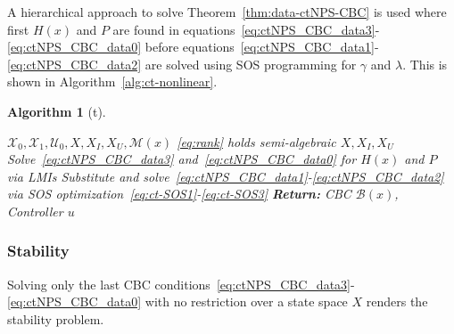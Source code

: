 \documentclass[sigconf]{acmart}
\newtheorem{algorithm}{Algorithm}
\begin{document}


A hierarchical approach to solve Theorem~\ref{thm:data-ctNPS-CBC} is used where first $H(x)$ and $P$ are found in equations~\eqref{eq:ctNPS_CBC_data3}-\eqref{eq:ctNPS_CBC_data0} before equations~\eqref{eq:ctNPS_CBC_data1}-\eqref{eq:ctNPS_CBC_data2} are solved using SOS programming for $\gamma$ and $\lambda$.
This is shown in Algorithm~\ref{alg:ct-nonlinear}.

\begin{algorithm}[t]
\caption{Hierarchy for ct-NPS CBCs}\label{alg:ct-nonlinear}
\begin{algorithmic}[1]
\Require $\mathcal{X}_0,\mathcal{X}_1,\mathcal{U}_0,X,X_I,X_U, \mathcal{M}(x)$
\Ensure \eqref{eq:rank} holds
\Ensure semi-algebraic $X,X_I,X_U$
\State Solve~\eqref{eq:ctNPS_CBC_data3} and~\eqref{eq:ctNPS_CBC_data0} for $H(x)$ and $P$ via LMIs
\State Substitute and solve~\eqref{eq:ctNPS_CBC_data1}-\eqref{eq:ctNPS_CBC_data2} via SOS optimization~\eqref{eq:ct-SOS1}-\eqref{eq:ct-SOS3}
\noindent\Statex\textbf{Return:} CBC $\mathcal{B}(x)$, Controller $u$
\end{algorithmic}
\end{algorithm}

\subsubsection{Stability}

Solving only the last CBC conditions~\eqref{eq:ctNPS_CBC_data3}-\eqref{eq:ctNPS_CBC_data0} with no restriction over a state space $X$ renders the stability problem.
\end{document}
